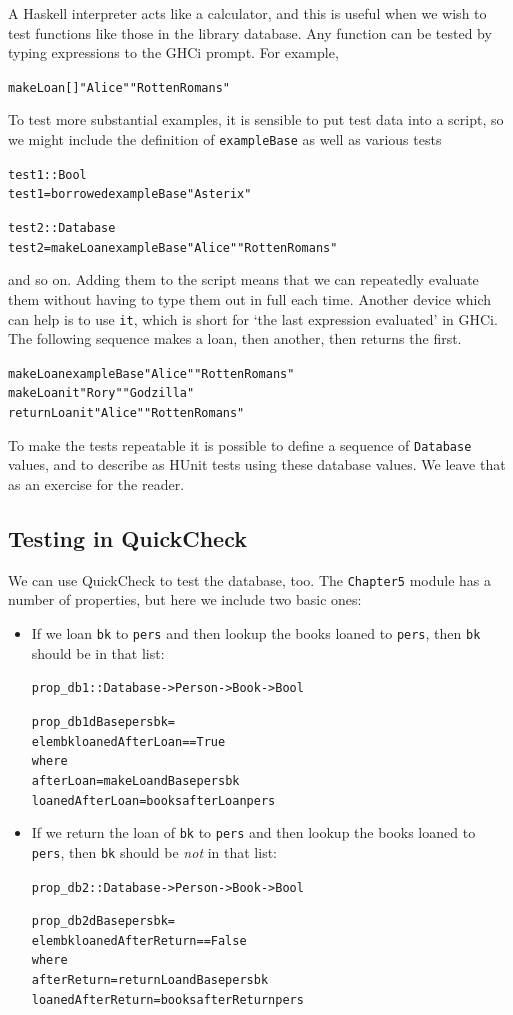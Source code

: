 A Haskell interpreter
acts like a calculator, and this is useful when we wish to test
functions like those in the library database. Any function can be tested by
typing expressions to the GHCi prompt. For example,
\begin{alltt}
makeLoan [] "Alice" "Rotten Romans"
\end{alltt}
To test more substantial examples, it is sensible to put test data into a
script, so we might include the definition of \texttt{exampleBase} as well as
various tests
\begin{alltt}
test1 :: Bool
test1 = borrowed exampleBase "Asterix"

test2 :: Database
test2 = makeLoan exampleBase "Alice" "Rotten Romans"
\end{alltt}
and so on. Adding them to the script means that we can repeatedly evaluate them
without having to type them out in full each time. Another device which can
help is to use \texttt{it},
which is short for `the last expression evaluated' in GHCi.
The following sequence makes a loan, then another, then returns the first.
\begin{alltt}
makeLoan exampleBase "Alice" "Rotten Romans"
makeLoan it "Rory" "Godzilla"
returnLoan it "Alice" "Rotten Romans"
\end{alltt}
To make the tests repeatable it is possible to define a sequence of \texttt{Database} values, and to describe as HUnit tests using these database values. We leave that as an exercise for the reader.

\subsection*{Testing in QuickCheck}

We can use QuickCheck to test the database, too. The \texttt{Chapter5} module has a number of properties, but here we include two basic ones:
\begin{itemize}
\item
If we loan \texttt{bk} to \texttt{pers} and then lookup the books loaned to \texttt{pers}, then \texttt{bk} should be in that list:
\begin{alltt}
prop_db1 :: Database -> Person -> Book -> Bool

prop_db1 dBase pers bk =
    elem bk loanedAfterLoan == True
         where
           afterLoan = makeLoan dBase pers bk
           loanedAfterLoan = books afterLoan pers
\end{alltt}
\item
If we return the loan of \texttt{bk} to \texttt{pers} and then lookup the books loaned to \texttt{pers}, then \texttt{bk} should be \emph{not} in that list:
\begin{alltt}
prop_db2 :: Database -> Person -> Book -> Bool

prop_db2 dBase pers bk =
    elem bk loanedAfterReturn == False
         where
           afterReturn = returnLoan dBase pers bk
           loanedAfterReturn = books afterReturn pers
\end{alltt}
\end{itemize}

